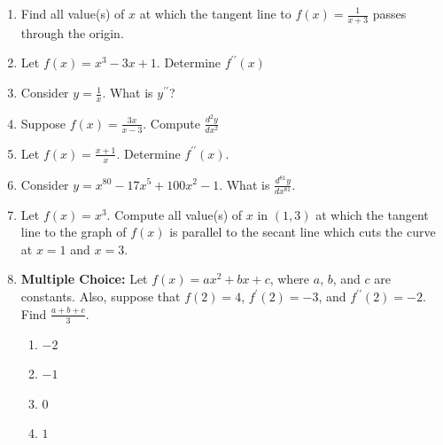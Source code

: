 \documentclass[12pt]{article}
\newif\ifans
\begin{document}
\begin{enumerate}
\ifans{\fbox{$x=0$ or $x=-2$}} \fi

\item Find all value(s) of $x$ at which the tangent line to $\displaystyle f(x)=\frac{1}{x+3}$ passes through the origin.

\ifans{\fbox{$\displaystyle -\frac{3}{2}$}} \fi

\item Let $f(x)=x^3-3x+1$.  Determine $f^{\prime \prime}(x)$

\ifans{\fbox{$6x$}} \fi

\item Consider $\displaystyle y=\frac{1}{x}$.  What is $y^{\prime \prime}$?

\ifans{\fbox{$\displaystyle \frac{2}{x^3}$}} \fi 

\item Suppose $\displaystyle f(x)=\frac{3x}{x-3}$.  Compute $\displaystyle \frac{d^2y}{dx^2}$

\ifans{\fbox{$\displaystyle \frac{18}{(x-3)^3}$}} \fi

\item Let $\displaystyle f(x)=\frac{x+1}{x}$.  Determine $f^{\prime \prime}(x)$.

\ifans{\fbox{$\displaystyle \frac{2}{x^3}$}} \fi 

\item Consider $y=x^{80}-17x^5+100x^2-1$.  What is $\displaystyle \frac{d^{81}y}{dx^{81}}$.

\ifans{\fbox{0}} \fi 

\item Let $f(x)=x^3$.  Compute all value(s) of $x$ in $(1,3)$ at which the tangent line to the graph of $f(x)$ is parallel to the secant line which cuts the curve at $x=1$ and $x=3$.

\ifans{\fbox{$\displaystyle x=\sqrt{\frac{13}{3}}$}} \fi

\item {\bf Multiple Choice:} Let $f(x)=ax^2+bx+c$, where $a$, $b$, and $c$ are constants.  Also, suppose that $f(2)=4$, $f^{\prime}(2)=-3$, and $f^{\prime \prime}(2)=-2$.  Find $\frac{a+b+c}{3}$.

\begin{enumerate}

\item $-2$

\item $-1$

\item $0$

\item $1$


\end{enumerate}
\end{enumerate}
\end{document}
